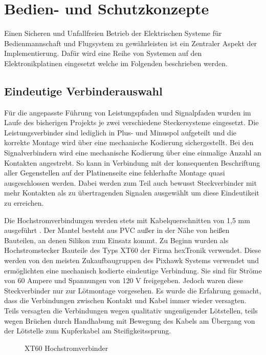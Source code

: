 \section{Bedien- und Schutzkonzepte}

Einen Sicheren und Unfallfreien Betrieb der Elektrischen Systeme für Bedienmannschaft und Flugsystem zu gewährleisten ist ein Zentraler Aspekt der Implementierung. Dafür wird eine Reihe von Systemen auf den Elektronikplatinen eingesetzt welche im Folgenden beschrieben werden.

\subsection{Eindeutige Verbinderauswahl}

Für die angepasste Führung von Leistungspfaden und Signalpfaden wurden im Laufe des bisherigen Projekts je zwei verschiedene Steckersysteme eingesetzt.
Die Leistungsverbinder sind lediglich in Plus- und Minuspol aufgeteilt und die korrekte Montage wird über eine mechanische Kodierung sichergestellt.
Bei den Signalverbindern wird eine mechanische Kodierung über eine einmalige Anzahl an Kontakten angestrebt. So kann in Verbindung mit der konsequenten Beschriftung aller Gegenstellen auf der Platinenseite eine fehlerhafte Montage quasi ausgeschlossen werden. Dabei werden zum Teil auch bewusst Steckverbinder mit mehr Kontakten als zu übertragenden Signalen ausgewählt um diese Eindeutikeit zu erreichen.

Die Hochstromverbindungen werden stets mit Kabelquerschnitten von 1,5 mm ausgeführt \cite{DIN_VDE_0298}. Der Mantel besteht aus PVC außer in der Nähe von heißen Bauteilen, an denen Silikon zum Einsatz kommt.
Zu Beginn wurden als Hochstromstecker Bauteile des Typs XT60 der Firma hexTronik verwendet.
Diese werden von den meisten Zukaufbaugruppen des Pixhawk Systems verwendet und ermöglichten eine mechanisch kodierte eindeutige Verbindung.
Sie sind für Ströme von 60 Ampere und Spannungen von 120 V freigegeben.
Jedoch waren diese Steckverbinder nur zur Lötmontage vorgesehen. Es wurde die Erfahrung gemacht, dass die Verbindungen zwischen Kontakt und  Kabel immer wieder versagten. Teils versagten die Verbindungen wegen qualitativ ungenügender Lötstellen, teils wegen Brüchen durch Handhabung mit Bewegung des Kabels am Übergang von der Lötstelle zum Kupferkabel am Steifigkeitssprung.

\begin{figure}[H]
\centering
{}
\caption{XT60 Hochstromverbinder} 
\label{fig:XT60 Hochstromverbinder}
\end{figure}

